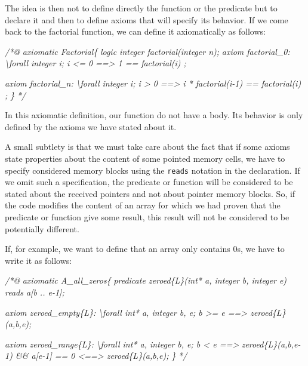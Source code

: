 \documentclass[12pt,francais,]{scrbook}
\newenvironment{Shaded}{}{}
\newcommand{\CommentTok}[1]{\textcolor[rgb]{0.38,0.63,0.69}{\textit{{#1}}}}
\begin{document}
The idea is then not to define directly the function or the predicate
but to declare it and then to define axioms that will specify its
behavior. If we come back to the factorial function, we can define it
axiomatically as follows:

\begin{footnotesize}\begin{Shaded}
\begin{Highlighting}[]
\CommentTok{/*@}
\CommentTok{  axiomatic Factorial\{}
\CommentTok{    logic integer factorial(integer n);}
\CommentTok{    }
\CommentTok{    axiom factorial_0:}
\CommentTok{      \textbackslash{}forall integer i; i <= 0 ==> 1 == factorial(i) ;}

\CommentTok{    axiom factorial_n:}
\CommentTok{      \textbackslash{}forall integer i; i > 0 ==> i * factorial(i-1) == factorial(i) ;}
\CommentTok{  \}}
\CommentTok{*/}
\end{Highlighting}
\end{Shaded}\end{footnotesize}

In this axiomatic definition, our function do not have a body. Its
behavior is only defined by the axioms we have stated about it.

A small subtlety is that we must take care about the fact that if some
axioms state properties about the content of some pointed memory cells,
we have to specify considered memory blocks using the \texttt{reads}
notation in the declaration. If we omit such a specification, the
predicate or function will be considered to be stated about the received
pointers and not about pointer memory blocks. So, if the code modifies
the content of an array for which we had proven that the predicate or
function give some result, this result will not be considered to be
potentially different.

If, for example, we want to define that an array only contains 0s, we
have to write it as follows:

\begin{footnotesize}\begin{Shaded}
\begin{Highlighting}[]
\CommentTok{/*@}
\CommentTok{  axiomatic A_all_zeros\{}
\CommentTok{    predicate zeroed\{L\}(int* a, integer b, integer e) reads a[b .. e-1];}

\CommentTok{    axiom zeroed_empty\{L\}:}
\CommentTok{      \textbackslash{}forall int* a, integer b, e; b >= e ==> zeroed\{L\}(a,b,e);}

\CommentTok{    axiom zeroed_range\{L\}:}
\CommentTok{      \textbackslash{}forall int* a, integer b, e; b < e ==>}
\CommentTok{        zeroed\{L\}(a,b,e-1) && a[e-1] == 0 <==> zeroed\{L\}(a,b,e);}
\CommentTok{  \}}
\CommentTok{*/}
\end{Highlighting}
\end{Shaded}\end{footnotesize}
\end{document}
